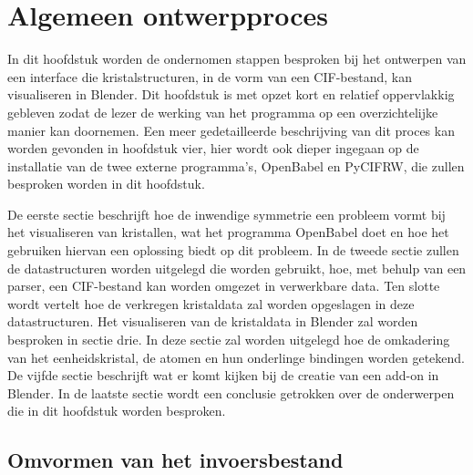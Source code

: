 

\chapter{Algemeen ontwerpproces}

In dit hoofdstuk worden de ondernomen stappen besproken bij het ontwerpen van een interface die kristalstructuren, in de vorm van een CIF-bestand, kan visualiseren in Blender. Dit hoofdstuk is met opzet kort en relatief oppervlakkig gebleven zodat de lezer de werking van het programma op een overzichtelijke manier kan doornemen. Een meer gedetailleerde beschrijving van dit proces kan worden gevonden in hoofdstuk vier, hier wordt ook dieper ingegaan op de installatie van de twee externe programma's, OpenBabel en PyCIFRW, die zullen besproken worden in dit hoofdstuk.
\par
De eerste sectie beschrijft hoe de inwendige symmetrie een probleem vormt bij het visualiseren van kristallen, wat het programma OpenBabel doet en hoe het gebruiken hiervan een oplossing biedt op dit probleem.
In de tweede sectie zullen de datastructuren worden uitgelegd die worden gebruikt, hoe, met behulp van een parser, een CIF-bestand kan worden omgezet in verwerkbare data. Ten slotte wordt vertelt hoe de verkregen kristaldata zal worden opgeslagen in deze datastructuren.
Het visualiseren van de kristaldata in Blender zal worden besproken in sectie drie. In deze sectie zal worden uitgelegd hoe de omkadering van het eenheidskristal, de atomen en hun onderlinge bindingen worden getekend.
De vijfde sectie beschrijft wat er komt kijken bij de creatie van een add-on in Blender. 
In de laatste sectie wordt een conclusie getrokken over de onderwerpen die in dit hoofdstuk worden besproken.


\section{Omvormen van het invoersbestand}

